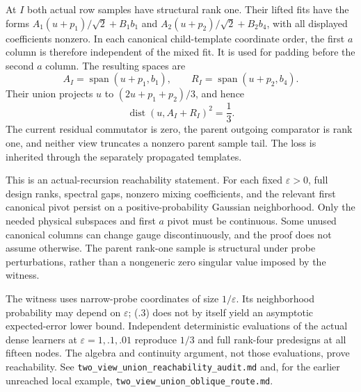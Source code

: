 \documentclass[11pt,oneside,openany,a4paper]{book}
\numberwithin{equation}{chapter}
\theoremstyle{definition}
\theoremstyle{remark}
\newcommand{\sourcefile}[1]{{\small\nolinkurl{#1}}}
\begin{document}
At $I$ both actual row samples have structural rank one.  Their lifted
fits have the forms
$A_1(u+p_1)/\sqrt2+B_1b_1$ and
$A_2(u+p_2)/\sqrt2+B_2b_4$, with all displayed coefficients nonzero.
In each canonical child-template coordinate order, the first $a$
column is therefore independent of the mixed fit.  It is used for
padding before the second $a$ column.  The resulting spaces are
\[
 A_I=\operatorname{span}(u+p_1,b_1),\qquad
 R_I=\operatorname{span}(u+p_2,b_4).
\]
Their union projects $u$ to $(2u+p_1+p_2)/3$, and hence
\[
 \operatorname{dist}(u,A_I+R_I)^2=\frac13.
 \tag{\thechapter.3}
\]
The current residual commutator is zero, the parent outgoing comparator
is rank one, and neither view truncates a nonzero parent sample tail.
The loss is inherited through the separately propagated templates.

This is an actual-recursion reachability statement.  For each fixed
$\varepsilon>0$, full design ranks, spectral gaps, nonzero mixing
coefficients, and the relevant first canonical pivot persist on a
positive-probability Gaussian neighborhood.  Only the needed physical
subspaces and first $a$ pivot must be continuous.  Some unused canonical
columns can change gauge discontinuously, and the proof does not assume
otherwise.  The parent rank-one sample is structural under probe
perturbations, rather than a nongeneric zero singular value imposed by
the witness.

The witness uses narrow-probe coordinates of size $1/\varepsilon$.
Its neighborhood probability may depend on $\varepsilon$; (\thechapter.3)
does not by itself yield an asymptotic expected-error lower bound.
Independent deterministic evaluations of the actual dense learners at
$\varepsilon=1,.1,.01$ reproduce $1/3$ and full rank-four predesigns at
all fifteen nodes.  The algebra and continuity argument, not those
evaluations, prove reachability.  See
\sourcefile{two_view_union_reachability_audit.md} and, for the earlier
unreached local example, \sourcefile{two_view_union_oblique_route.md}.
\end{document}
